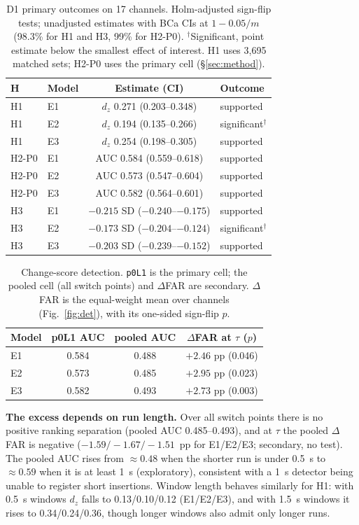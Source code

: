 \documentclass[conference]{IEEEtran}
\begin{document}
\begin{table}[t]
\caption{D1 primary outcomes on 17 channels. Holm-adjusted sign-flip tests; unadjusted
estimates with BCa CIs at $1-0.05/m$ (98.3\% for H1 and H3, 99\% for H2-P0).
$^\dagger$Significant, point estimate below the smallest effect of interest. H1 uses 3{,}695
matched sets; H2-P0 uses the primary cell (\S\ref{sec:method}).}
\label{tab:d1-primary}
\centering
\setlength{\tabcolsep}{5pt}
\begin{tabular}{llcl}
\toprule
H & Model & Estimate (CI) & Outcome \\
\midrule
H1 & E1 & $d_z$ 0.271 (0.203--0.348) & supported \\
H1 & E2 & $d_z$ 0.194 (0.135--0.266) & significant$^\dagger$ \\
H1 & E3 & $d_z$ 0.254 (0.198--0.305) & supported \\
H2-P0 & E1 & AUC 0.584 (0.559--0.618) & supported \\
H2-P0 & E2 & AUC 0.573 (0.547--0.604) & supported \\
H2-P0 & E3 & AUC 0.582 (0.564--0.601) & supported \\
H3 & E1 & $-0.215$ SD ($-0.240$--$-0.175$) & supported \\
H3 & E2 & $-0.173$ SD ($-0.204$--$-0.124$) & significant$^\dagger$ \\
H3 & E3 & $-0.203$ SD ($-0.239$--$-0.152$) & supported \\
\bottomrule
\end{tabular}
\end{table}

\begin{table}[t]
\caption{Change-score detection. \texttt{p0L1} is the primary cell; the pooled cell (all
switch points) and $\Delta$FAR are secondary. $\Delta$FAR is the equal-weight mean over
channels (Fig.~\ref{fig:det}), with its one-sided sign-flip $p$.}
\label{tab:d1-det}
\centering
\begin{tabular}{lccc}
\toprule
Model & p0L1 AUC & pooled AUC & $\Delta$FAR at $\tau$ ($p$) \\
\midrule
E1 & 0.584 & 0.488 & $+2.46$ pp (0.046) \\
E2 & 0.573 & 0.485 & $+2.95$ pp (0.023) \\
E3 & 0.582 & 0.493 & $+2.73$ pp (0.003) \\
\bottomrule
\end{tabular}
\end{table}

\textbf{The excess depends on run length.} Over all switch points there is no positive ranking separation (pooled AUC 0.485--0.493), and at $\tau$ the pooled $\Delta$FAR is negative ($-1.59/-1.67/-1.51$~pp for E1/E2/E3; secondary, no test). The pooled AUC rises from $\approx 0.48$ when the shorter
run is under 0.5~s to $\approx 0.59$ when it is at least 1~s (exploratory), consistent with a
1~s detector being unable to register short insertions. Window length behaves similarly for
H1: with 0.5~s windows $d_z$ falls to 0.13/0.10/0.12 (E1/E2/E3), and with 1.5~s windows it
rises to 0.34/0.24/0.36, though longer windows also admit only longer runs.
\end{document}
